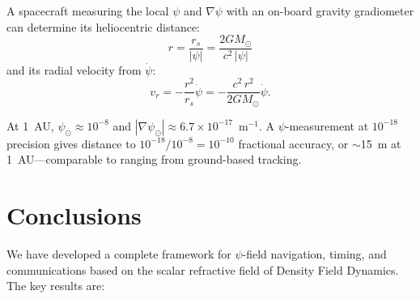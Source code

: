 \documentclass[aps,prd,twocolumn,superscriptaddress,nofootinbib]{revtex4-2}
\begin{document}
A spacecraft measuring the local $\psi$ and $\nabla\psi$ with an
on-board gravity gradiometer can determine its heliocentric distance:
\begin{equation}\label{eq:distance}
r = \frac{r_s}{|\psi|} = \frac{2GM_\odot}{c^2\,|\psi|}
\end{equation}
and its radial velocity from $\dot{\psi}$:
\begin{equation}\label{eq:radial-vel}
v_r = -\frac{r^2}{r_s}\dot{\psi} = -\frac{c^2\,r^2}{2GM_\odot}\dot{\psi}.
\end{equation}

At 1~AU, $\psi_\odot \approx 10^{-8}$ and
$|\nabla\psi_\odot| \approx 6.7\times10^{-17}$~m$^{-1}$.
A $\psi$-measurement at $10^{-18}$ precision gives distance to
$10^{-18}/10^{-8} = 10^{-10}$ fractional accuracy, or
$\sim$15~m at 1~AU---comparable to ranging from ground-based tracking.

\section{Conclusions}\label{sec:conclusions}

We have developed a complete framework for $\psi$-field navigation,
timing, and communications based on the scalar refractive field of
Density Field Dynamics. The key results are:
\end{document}
